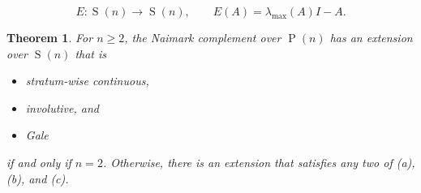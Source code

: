 \documentclass[10pt,a4paper]{amsart}
\newtheorem{thm}{Theorem}
\newcommand{\oP}{\operatorname{P}}
\newcommand{\oS}{\operatorname{S}}
\begin{document}
\begin{equation}
\label{eq.casazza}
E\colon\oS(n)\to\oS(n),
\qquad
E(A)=\lambda_{\max}(A)I-A.
\end{equation}

\begin{thm}
\label{thm.main}
For $n\geq2$, the Naimark complement over $\oP(n)$ has an extension over $\oS(n)$ that is
\begin{itemize}
\item[(a)] stratum-wise continuous,
\item[(b)] involutive, and
\item[(c)] Gale
\end{itemize}
if and only if $n=2$.
Otherwise, there is an extension that satisfies any two of (a), (b), and (c).
\end{thm}
\end{document}
